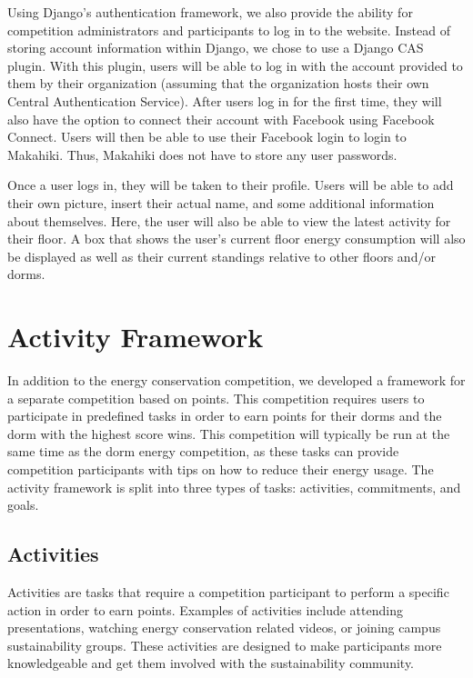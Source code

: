 Using Django's authentication framework, we also provide the ability for competition administrators and participants to log in to the website.  Instead of storing account information within Django, we chose to use a Django CAS plugin\cite{django-cas}.  With this plugin, users will be able to log in with the account provided to them by their organization (assuming that the organization hosts their own Central Authentication Service).  After users log in for the first time, they will also have the option to connect their account with Facebook using Facebook Connect.  Users will then be able to use their Facebook login to login to Makahiki.  Thus, Makahiki does not have to store any user passwords.

Once a user logs in, they will be taken to their profile.  Users will be able to add their own picture, insert their actual name, and some additional information about themselves.  Here, the user will also be able to view the latest activity for their floor.  A box that shows the user's current floor energy consumption will also be displayed as well as their current standings relative to other floors and/or dorms.

\section{Activity Framework}
\label{activity}

In addition to the energy conservation competition, we developed a framework for a separate competition based on points.  This competition requires users to participate in predefined tasks in order to earn points for their dorms and the dorm with the highest score wins.  This competition will typically be run at the same time as the dorm energy competition, as these tasks can provide competition participants with tips on how to reduce their energy usage.  The activity framework is split into three types of tasks: activities, commitments, and goals.

\subsection{Activities}

Activities are tasks that require a competition participant to perform a specific action in order to earn points.  Examples of activities include attending presentations, watching energy conservation related videos, or joining campus sustainability groups.  These activities are designed to make participants more knowledgeable and get them involved with the sustainability community.

